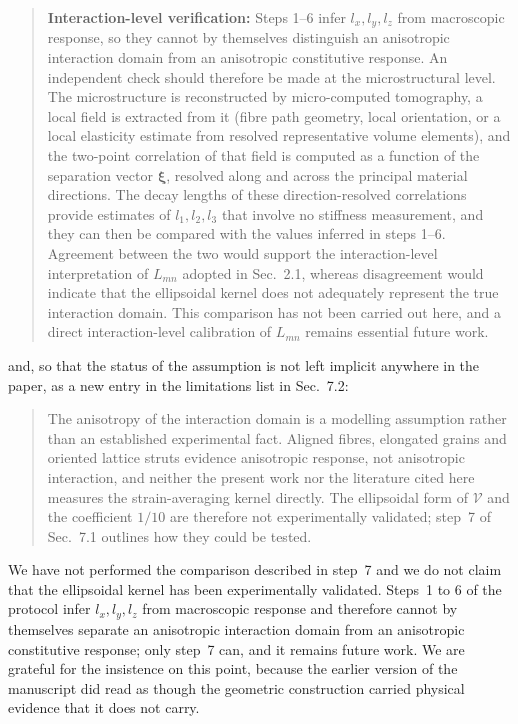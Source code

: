 \documentclass[12pt,a4paper]{article}
\begin{document}
\begin{quote}\small
  \textbf{Interaction-level verification:} Steps 1--6 infer
  $l_{x},l_{y},l_{z}$ from macroscopic response, so they cannot by
  themselves distinguish an anisotropic interaction domain from an
  anisotropic constitutive response. An independent check should
  therefore be made at the microstructural level. The microstructure is
  reconstructed by micro-computed tomography, a local field is extracted
  from it (fibre path geometry, local orientation, or a local elasticity
  estimate from resolved representative volume elements), and the
  two-point correlation of that field is computed as a function of the
  separation vector $\boldsymbol{\xi}$, resolved along and across the
  principal material directions. The decay lengths of these
  direction-resolved correlations provide estimates of $l_{1},l_{2},l_{3}$
  that involve no stiffness measurement, and they can then be compared
  with the values inferred in steps 1--6. Agreement between the two would
  support the interaction-level interpretation of $L_{mn}$ adopted in
  Sec.~2.1, whereas disagreement would
  indicate that the ellipsoidal kernel does not adequately represent the
  true interaction domain. This comparison has not been carried out here,
  and a direct interaction-level calibration of $L_{mn}$ remains essential
  future work.
\end{quote}

\noindent and, so that the status of the assumption is not left implicit anywhere in the paper, as a new entry in the limitations list in Sec.~7.2:

\begin{quote}\small
  The anisotropy of the interaction domain is a modelling
  assumption rather than an established experimental fact. Aligned fibres,
  elongated grains and oriented lattice struts evidence anisotropic
  response, not anisotropic interaction, and neither the present work nor
  the literature cited here measures the strain-averaging kernel directly.
  The ellipsoidal form of $\mathcal{V}$ and the coefficient $1/10$ are
  therefore not experimentally validated; step~7 of
  Sec.~7.1 outlines how they could be tested.
\end{quote}

We have not performed the comparison described in step~7 and we do not claim that the ellipsoidal kernel has been experimentally validated. Steps~1 to 6 of the protocol infer $l_x,l_y,l_z$ from macroscopic response and therefore cannot by themselves separate an anisotropic interaction domain from an anisotropic constitutive response; only step~7 can, and it remains future work. We are grateful for the insistence on this point, because the earlier version of the manuscript did read as though the geometric construction carried physical evidence that it does not carry.
\end{document}
